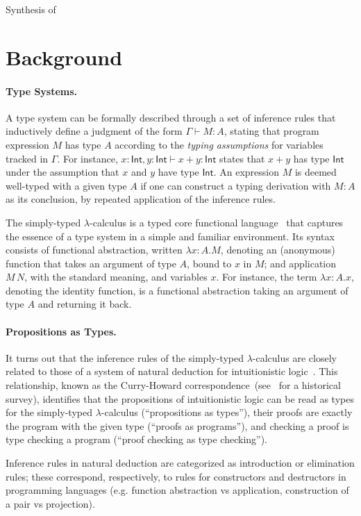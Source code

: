 \documentclass{llncs}
\newcommand{\mypara}[1]{\paragraph{\textbf{#1}.}}
\begin{document}
Synthesis of 


\section{Background}\label{sec:background}

\mypara{Type Systems} A type system can be formally described through
a set of inference rules that inductively define a judgment of the
form $\Gamma \vdash M : A$, stating that program expression $M$ has
type $A$ according to the \emph{typing assumptions} for variables
tracked in $\Gamma$. For instance,
$x{:}\mathsf{Int}, y{:}\mathsf{Int} \vdash x+y : \mathsf{Int}$ states
that $x+y$ has type $\mathsf{Int}$ under the assumption that $x$ and
$y$ have type $\mathsf{Int}$.  An expression $M$ is deemed well-typed
with a given type $A$ if one can construct a typing derivation with $M :
A$ as its conclusion, by repeated application of the inference rules.

The simply-typed $\lambda$-calculus is a typed core functional
language~\cite{10.5555/509043} that captures the essence of a type system in a simple and familiar environment. Its syntax consists of
functional abstraction, written $\lambda x{:}A.M$, denoting
an (anonymous) function that takes an argument of type $A$, bound to
$x$ in $M$; and application $M\,N$, with the standard meaning, and
variables $x$. For instance, the term $\lambda x{:}A.x$, denoting the identity function, is a functional abstraction
taking an argument of type $A$ and returning it back.

\mypara{Propositions as Types}
%
It turns out that the inference rules of the simply-typed
$\lambda$-calculus are closely related to those of a system of natural
deduction for intuitionistic logic~\cite{prawitznd65}. This
relationship, known as the Curry-Howard
correspondence~(see~\cite{DBLP:journals/cacm/Wadler15} for a
historical survey),
identifies that the propositions of intuitionistic logic can be read
as types for the simply-typed $\lambda$-calculus (``propositions as
types''), their proofs are exactly the program with the given type
(``proofs as programs''), and checking a proof is type checking a
program (``proof checking as type checking'').

Inference rules in natural deduction are categorized as introduction
or elimination rules; these correspond, respectively, to rules for
constructors and destructors in programming languages (e.g. function
abstraction vs application, construction of a pair vs projection).
\end{document}
